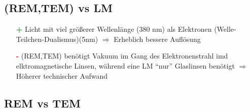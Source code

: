 \subsection*{(REM,TEM) vs LM}
\begin{itemize}
    \item[\textcolor{green}{\textbf{+}}] Licht mit viel größerer Wellenlänge (380 nm) als Elektronen (Welle-Teilchen-Dualismus)(5nm) $\Rightarrow$ Erheblich bessere Auflösung \\
    \item[\textcolor{red}{\textbf{-}}] (REM,TEM) benötigt Vakuum im Gang des Elektronenstrahl imd elktromagnetische Linsen, während eine LM \enquote{nur} Glaslinsen benötigt $\Rightarrow$ Höherer technischer Aufwand
\end{itemize}

\subsection*{REM vs TEM}
